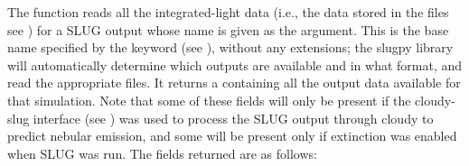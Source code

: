 \documentclass[letterpaper,10pt,english]{sphinxmanual}
\begin{document}
The  function reads all the integrated-light data (i.e., the data stored in the  files \textendash{} see {\hyperref[\detokenize{output:sec-output}]{}}) for a SLUG output whose name is given as the argument. This is the base name specified by the  keyword (see {\hyperref[\detokenize{parameters:ssec-basic-keywords}]{}}), without any extensions; the slugpy library will automatically determine which outputs are available and in what format, and read the appropriate files. It returns a  containing all the output data available for that simulation. Note that some of these fields will only be present if the cloudy-slug interface (see {\hyperref[\detokenize{cloudy:sec-cloudy-slug}]{}}) was used to process the SLUG output through cloudy to predict nebular emission, and some will be present only if extinction was enabled when SLUG was run. The fields returned are as follows:
\end{document}
